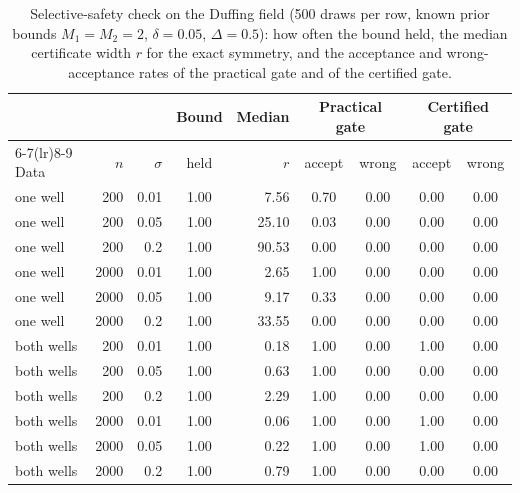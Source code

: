 \begin{table}[t]\centering\small
\caption{Selective-safety check on the Duffing field (500 draws per row, known prior bounds $M_1=M_2=2$, $\delta=0.05$, $\Delta=0.5$): how often the bound held, the median certificate width $r$ for the exact symmetry, and the acceptance and wrong-acceptance rates of the practical gate and of the certified gate.}\label{tab:selective}
\begin{tabular}{@{}lrrcrcccc@{}}
\toprule
 & & & Bound & Median & \multicolumn{2}{c}{Practical gate} & \multicolumn{2}{c}{Certified gate}\\
\cmidrule(lr){6-7}\cmidrule(lr){8-9}
Data & $n$ & $\sigma$ & held & $r$ & accept & wrong & accept & wrong\\
\midrule
one well & 200 & 0.01 & 1.00 & 7.56 & 0.70 & 0.00 & 0.00 & 0.00\\
one well & 200 & 0.05 & 1.00 & 25.10 & 0.03 & 0.00 & 0.00 & 0.00\\
one well & 200 & 0.2 & 1.00 & 90.53 & 0.00 & 0.00 & 0.00 & 0.00\\
one well & 2000 & 0.01 & 1.00 & 2.65 & 1.00 & 0.00 & 0.00 & 0.00\\
one well & 2000 & 0.05 & 1.00 & 9.17 & 0.33 & 0.00 & 0.00 & 0.00\\
one well & 2000 & 0.2 & 1.00 & 33.55 & 0.00 & 0.00 & 0.00 & 0.00\\
both wells & 200 & 0.01 & 1.00 & 0.18 & 1.00 & 0.00 & 1.00 & 0.00\\
both wells & 200 & 0.05 & 1.00 & 0.63 & 1.00 & 0.00 & 0.00 & 0.00\\
both wells & 200 & 0.2 & 1.00 & 2.29 & 1.00 & 0.00 & 0.00 & 0.00\\
both wells & 2000 & 0.01 & 1.00 & 0.06 & 1.00 & 0.00 & 1.00 & 0.00\\
both wells & 2000 & 0.05 & 1.00 & 0.22 & 1.00 & 0.00 & 1.00 & 0.00\\
both wells & 2000 & 0.2 & 1.00 & 0.79 & 1.00 & 0.00 & 0.00 & 0.00\\
\bottomrule
\end{tabular}
\end{table}

